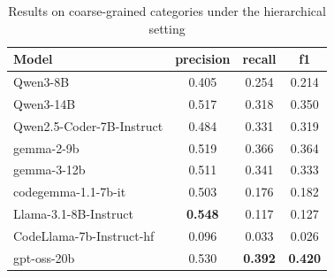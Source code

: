\begin{table}[htbp]
  \centering
  \caption{Results on coarse-grained categories under the hierarchical setting}
  \label{tab:hierarchical-coarse}
  \setlength{\tabcolsep}{6pt}
  \renewcommand{\arraystretch}{1.15}
  \begin{tabular}{lccc}
    \toprule
    Model & precision & recall & f1 \\
    \midrule
    Qwen3-8B                  & 0.405 & 0.254 & 0.214 \\
    Qwen3-14B                 & 0.517 & 0.318 & 0.350 \\
    Qwen2.5-Coder-7B-Instruct & 0.484 & 0.331 & 0.319 \\
    gemma-2-9b                & 0.519 & 0.366 & 0.364 \\
    gemma-3-12b               & 0.511 & 0.341 & 0.333 \\
    codegemma-1.1-7b-it       & 0.503 & 0.176 & 0.182 \\
    Llama-3.1-8B-Instruct     & \textbf{0.548} & 0.117 & 0.127 \\
    CodeLlama-7b-Instruct-hf  & 0.096 & 0.033 & 0.026 \\
    gpt-oss-20b               & 0.530 & \textbf{0.392} & \textbf{0.420} \\
    \bottomrule
  \end{tabular}
\end{table}
